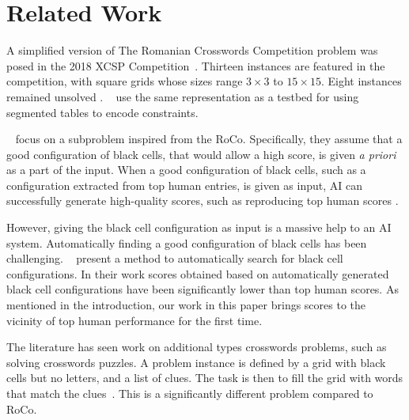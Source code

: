 \section{Related Work}
\label{sec::relwork}

A simplified version of The Romanian Crosswords Competition problem was posed
in the 2018 XCSP Competition~\cite{DBLP:journals/corr/abs-1901-01830}.
Thirteen instances are featured in the competition, 
with square grids whose sizes range $3 \times 3$ to $15 \times 15$.
Eight instances remained unsolved \cite{DBLP:journals/corr/abs-1901-01830}.
\citeauthor{DBLP:conf/ecai/AudemardLM20}~
use the same representation
as a testbed for using segmented tables
to encode constraints.

\citeauthor{DBLP:conf/socs/BoteaB21}~
focus on a subproblem inspired from the {\sc RoCo}.
Specifically, they assume that 
a good configuration of black cells,
that would allow a high score,
is given {\em a priori} as a part of the input.
When a good configuration of black cells,
such as a configuration extracted from top human entries,
is given as input, AI can successfully generate high-quality scores,
such as reproducing top human scores \cite{DBLP:conf/socs/BoteaB21}.

However, giving the black cell configuration as input is a massive help to an AI system.
Automatically finding a good configuration of black cells
has been challenging. 
\citeauthor{DBLP:conf/cig/BulitkoB21}~
present a method to automatically search for black cell configurations.
In their work scores obtained based on automatically generated
black cell configurations have been significantly lower than 
top human scores.
As mentioned in the introduction, our work in this paper brings scores
to the vicinity of top human performance for the first time.


The literature has seen work on additional types crosswords problems,
such as solving crosswords puzzles.
A problem instance is defined by a grid with black cells but no letters,
and a list of clues.
The task is then to fill the grid with words that match the 
clues~\cite{DBLP:journals/ai/LittmanKS02,DBLP:conf/aaai/ErnandesAG05,DBLP:journals/jair/Ginsberg11,Chen-icaps22}.
This is a significantly different problem compared to {\sc RoCo}.


\begin{comment}
The problem of \emph{crosswords grid generation} takes as input
a list of words and
a grid with only black cells.
The task is to fill the grid with words from the
list~\cite{MAZLACK19761,10.5555/1865499.1865531,botea-modref07,anbulagan-botea-cp08}.
As mentioned in the introduction and in Section~\ref{sec::background}, {\sc Roco}
is a significant generalization of the standard crosswords grid generation.
\end{comment}